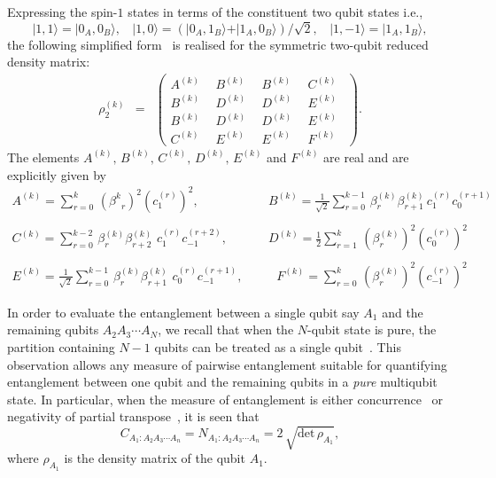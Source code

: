 \documentclass[pra,a4paper,showpacs,superscriptaddress]{revtex4}
\newcommand{\be}{\begin{equation}}
\newcommand{\ee}{\end{equation}}
\newcommand{\ba}[1]{\left(\begin{array}{#1}}
\newcommand{\ea}{\end{array}\right)}
\begin{document}
Expressing the spin-$1$ states in terms of the constituent two qubit states i.e., 
\[ 
\vert 1,1\rangle=\vert 0_A,0_B\rangle,\ \ \ \ \vert 1,0\rangle=(\vert 0_A,1_B\rangle+\vert 1_A,0_B\rangle)/\sqrt{2},\ \ \ \ 
\vert 1,-1\rangle=\vert 1_A,1_B\rangle, 
\] 
the following simplified form~\cite{s2,Vidal06} is realised for the symmetric two-qubit reduced density matrix:     
\begin{eqnarray}
\label{rhok_matrix}
\rho^{(k)}_2&=&\ba{cccc} A^{(k)} \ \ & B^{(k)} \ \ & B^{(k)}\ \  & C^{(k)} \ \  \\ B^{(k)} \ \  & D^{(k)}\ \  & D^{(k)}\ \  & E^{(k)} \ \   \\ B^{(k)} \ \  & D^{(k)} \ \  & D^{(k)} \ \ & E^{(k)} \ \  \\ C^{(k)} \ \  & E^{(k)} \ \  & E^{(k)} \ \  & F^{(k)} \ \  \ea. 
\end{eqnarray}
The elements $A^{(k)},\, B^{(k)},\, C^{(k)},\, D^{(k)},\, E^{(k)}$ and $F^{(k)}$ are real and are explicitly given by~\cite{spin1}
\begin{eqnarray}
\label{elements}
A^{(k)}=\sum_{r=0}^k\, \left({\beta^{k}}_r\right)^2 \left({c^{(r)}_{1}}\right)^2, \  & & \  B^{(k)}=\frac{1}{\sqrt{2}}\sum_{r=0}^{k-1}\, 
{\beta^{(k)}_r} \beta^{(k)}_{r+1}\, c^{(r)}_{1} 
c^{(r+1)}_{0} \nonumber \\ 
& & \nonumber \\ 
C^{(k)}=\sum_{r=0}^{k-2}\, \beta^{(k)}_r \beta^{(k)}_{r+2}\,\, c^{(r)}_{1} c^{(r+2)}_{-1}, \  & & \  
D^{(k)}=\frac{1}{2}\sum_{r=1}^{k}\, \left({\beta_r^{(k)}}\right)^2  \left({c^{(r)}_{0}}\right)^2 \\
& & \nonumber \\ 
E^{(k)}=\frac{1}{\sqrt{2}}\sum_{r=0}^{k-1}\, \beta^{(k)}_r \beta^{(k)}_{r+1}\,\, c^{(r)}_{0}c^{(r+1)}_{-1}, \  & &  \  
 \ \ \ F^{(k)}=\sum_{r=0}^k\, \left({\beta_r^{(k)}}\right)^2  \left({c^{(r)}_{-1}}\right)^2 \nonumber
\end{eqnarray} 

In order to evaluate the entanglement between a single qubit say $A_1$ and the remaining qubits $A_2 A_3 \cdots A_N$, 
we recall that when the $N$-qubit state is pure, the partition containing $N-1$ qubits can be treated as a single qubit~\cite{ckw}. This observation allows any measure of pairwise entanglement suitable for quantifying entanglement between one qubit and the remaining qubits in a {\emph{pure}} multiqubit state. 
In particular, when the measure of entanglement is either concurrence~\cite{con1} or negativity of partial transpose~\cite{ppt1,ppt2,ppt3}, it is seen that~\cite{ckw,neg}
\be
\label{squbit}
C_{A_1:A_2A_3\cdots A_n}=N_{A_1:A_2A_3\cdots A_n}=2 \,\sqrt{\mbox{det}\,\rho_{A_1}},
\ee
where $\rho_{A_1}$ is the density matrix of the qubit $A_1$. 
\end{document}
